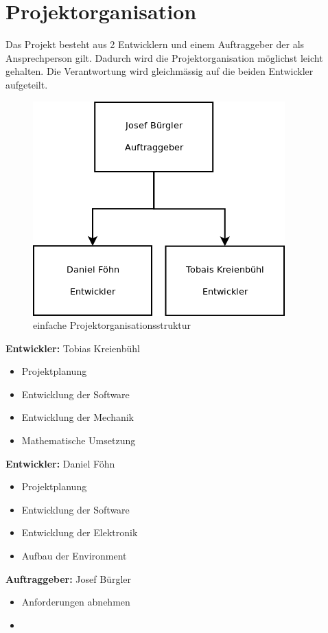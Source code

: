 \documentclass[a4paper, 10pt, fleqn]{article}
\begin{document}
	\section{Projektorganisation}
        Das Projekt besteht aus 2 Entwicklern und einem Auftraggeber der als Ansprechperson gilt. Dadurch wird die Projektorganisation möglichst leicht gehalten. Die Verantwortung wird gleichmässig auf die beiden Entwickler aufgeteilt.
        \begin{figure}[H]
            \centering
            \includegraphics[width=.5\textwidth]{organisation.png}
            \caption{einfache Projektorganisationsstruktur}
        \end{figure}
		\textbf{Entwickler:} Tobias Kreienbühl
        \begin{itemize}
            \item Projektplanung
            \item Entwicklung der Software
            \item Entwicklung der Mechanik
            \item Mathematische Umsetzung
        \end{itemize}
        \vspace{.5cm}
        \textbf{Entwickler:} Daniel Föhn
        \begin{itemize}
            \item Projektplanung
            \item Entwicklung der Software
            \item Entwicklung der Elektronik
            \item Aufbau der Environment
        \end{itemize}
        \vspace{.5cm}
        \textbf{Auftraggeber:} Josef Bürgler
        \begin{itemize}
            \item Anforderungen abnehmen
            \item 
        \end{itemize}
    
\end{document}
